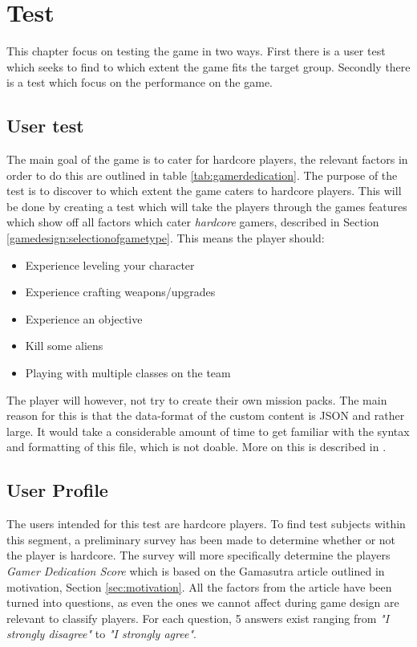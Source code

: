 \chapter{Test}
This chapter focus on testing the game in two ways. First there is a user test which seeks to find to which extent the game fits the target group. Secondly there is a test which focus on the performance on the game.

\section{User test}
The main goal of the game is to cater for hardcore players, the relevant factors in order to do this are outlined in table \ref{tab:gamerdedication}.
The purpose of the test is to discover to which extent the game caters to hardcore players.
This will be done by creating a test which will take the players through the games features which show off all factors which cater \emph{hardcore} gamers, described in Section \ref{gamedesign:selectionofgametype}.
This means the player should:
\begin{itemize}
	\item Experience leveling your character
	\item Experience crafting weapons/upgrades
	\item Experience an objective
	\item Kill some aliens
	\item Playing with multiple classes on the team
\end{itemize}

The player will however, not try to create their own mission packs. The main reason for this is that the data-format of the custom content is JSON and rather large. It would take a considerable amount of time to get familiar with the syntax and formatting of this file, which is not doable. More on this is described in .

\section{User Profile}
The users intended for this test are hardcore players.
To find test subjects within this segment, a preliminary survey has been made to determine whether or not the player is hardcore.
The survey will more specifically determine the players \textit{Gamer Dedication Score} which is based on the Gamasutra article\cite{casual_vs_hardcore} outlined in motivation, Section \ref{sec:motivation}.
All the factors from the article have been turned into questions, as even the ones we cannot affect during game design are relevant to classify players.
For each question, 5 answers exist ranging from \textit{"I strongly disagree"} to \textit{"I strongly agree"}.

